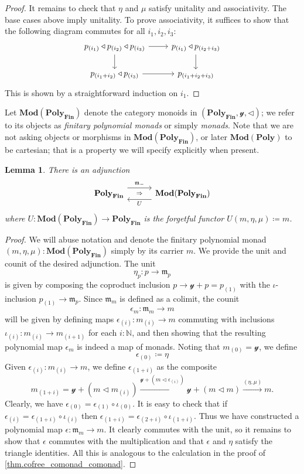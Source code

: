 \documentclass[11pt, one side, article]{memoir}
\newcommand{\adj}[5][30pt]{%
\begin{tikzcd}[ampersand replacement=\&, column sep=#1]
  #2\ar[r, shift left=7pt, "#3"]
  \ar[r, phantom, "\scriptstyle\Rightarrow"]\&
  #5\ar[l, shift left=7pt, "#4"]
\end{tikzcd}
}
\theoremstyle{definition}
\theoremstyle{plain}
\newtheorem{lemma}[definitionx]{Lemma}
\newcommand{\Cat}[1]{\mathbf{#1}}%
\newcommand{\To}[2][]{\xrightarrow[#1]{#2}}
\newcommand{\nn}{\mathbb{N}}
\newcommand{\finset}{\Cat{Fin}}
\newcommand{\polyfin}{\poly_{\finset}}
\newcommand{\Mod}{\Cat{Mod}}
\newcommand{\yon}{\mathcal{y}}
\newcommand{\poly}{\Cat{Poly}}
\newcommand{\tri}{\mathbin{\triangleleft}}
\newcommand{\free}{\mathfrak{m}}
\newcommand{\hoc}[1]{_{(#1)}}
\begin{document}
\begin{proof}
It remains to check that $\eta$ and $\mu$ satisfy unitality and associativity. The base cases above imply unitality. To prove associativity, it suffices to show that the following diagram commutes for all $i_1,i_2,i_3$:
\[
\begin{tikzcd}
	p\hoc{i_1}\tri p\hoc{i_2}\tri p\hoc{i_3}\ar[r]\ar[d]&
	p\hoc{i_1}\tri p\hoc{i_2+i_3}\ar[d]\\
	p\hoc{i_1+i_2}\tri p\hoc{i_3}\ar[r]&
	p\hoc{i_1+i_2+i_3}
\end{tikzcd}
\]
This is shown by a straightforward induction on $i_1$.
\end{proof}

Let $\Mod(\polyfin)$ denote the category monoids in $(\polyfin,\yon,\tri)$; we refer to its objects as \emph{finitary polynomial monads} or simply \emph{monads}. Note that we are not asking objects or morphisms in $\Mod(\polyfin)$, or later $\Mod(\poly)$ to be cartesian; that is a property we will specify explicitly when present.

\begin{lemma}\label{lemma.free_polyfin}
There is an adjunction
\[
\adj{\polyfin}{\free_-}{U}{\Mod(\polyfin)}
\]
where $U\colon\Mod(\polyfin)\to\polyfin$ is the forgetful functor $U(m,\eta,\mu)\coloneqq m$.
\end{lemma}
\begin{proof}
We will abuse notation and denote the finitary polynomial monad $(m,\eta,\mu):\Mod(\polyfin)$ simply by its carrier $m$. We provide the unit and counit of the desired adjunction. The unit
\[
\eta_p\colon p\to\free_p
\]
is given by composing the coproduct inclusion $p\to\yon+p=p\hoc{1}$ with the $\iota$-inclusion $p\hoc{1}\to\free_{p}$. Since $\free_m$ is defined as a colimit, the counit
\[\epsilon_m\colon\free_m\to m\]
will be given by defining maps $\epsilon\hoc{i}\colon m\hoc{i}\to m$ commuting with inclusions $\iota\hoc{i}\colon m\hoc{i}\to m\hoc{i+1}$ for each $i:\nn$, and then showing that the resulting polynomial map $\epsilon_m$ is indeed a map of monads. Noting that $m\hoc{0}=\yon$, we define
\[
\epsilon\hoc{0}\coloneqq\eta
\]
Given $\epsilon\hoc{i}\colon m\hoc{i}\to m$, we define $\epsilon\hoc{1+i}$ as the composite
\[
	m\hoc{1+i}=
  \yon+\left(m\tri m\hoc{i}\right)\To{\yon+(m\tri\epsilon\hoc{i})}
	\yon+(m\tri m)\To{(\eta,\mu)}
	m.
\]
Clearly, we have $\epsilon\hoc{0}=\epsilon\hoc{1}\circ\iota\hoc{0}$. It is easy to check that if $\epsilon\hoc{i}=\epsilon\hoc{1+i}\circ\iota\hoc{i}$ then $\epsilon\hoc{1+i}=\epsilon\hoc{2+i}\circ\iota\hoc{1+i}$. Thus we have constructed a polynomial map $\epsilon\colon \free_m\to m$. It clearly commutes with the unit, so it remains to show that $\epsilon$ commutes with the multiplication and that $\epsilon$ and $\eta$ satisfy the triangle identities. All this is analogous to the calculation in the proof of \cref{thm.cofree_comonad_comonad}.
\end{proof}
\end{document}
